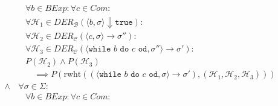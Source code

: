 \begin{align*}
																		                  & \quad \forall b \in \textit{BExp} : \forall c \in \textit{Com} : \tag{Ausdrucksbestandteile}                                                                                                                                                              \\
																		                  & \quad \forall \mathcal{H} _ 1 \in \textit{DER} _ \mathcal{B} (\langle b, \sigma \rangle \Downarrow \texttt{true}) : \tag{Kalkülfremde Herleitungen}                                                                                                       \\
																		                  & \quad \forall \mathcal{H} _ 2 \in \textit{DER} _ \mathcal{C} (\langle c, \sigma \rangle \rightarrow \sigma'') : \tag{Herleitungen in Prämisse}                                                                                                            \\
																		                  & \quad \forall \mathcal{H} _ 3 \in \textit{DER} _ \mathcal{C} (\langle \texttt{while } b \texttt{ do } c \texttt{ od}, \sigma'' \rangle \rightarrow \sigma') : \tag{Herleitungen in Prämisse}                                                              \\
																		                  & \quad P(\mathcal{H} _ 2) \land P(\mathcal{H} _ 3) \tag{Prämisse}                                                                                                                                                                                          \\
																		                  & \quad\quad \implies P(\text{rwht}((\langle \texttt{while } b \texttt{ do } c \texttt{ od}, \sigma \rangle \rightarrow \sigma'), (\mathcal{H} _ 1, \mathcal{H} _ 2, \mathcal{H} _ 3))) \tag{Konklusion}                                                    \\
																		\land             & \,\forall \sigma \in \Sigma : \tag{Zustände}                                                                                                                                                                                                              \\
																		                  & \quad \forall b \in \textit{BExp} : \forall c \in \textit{Com} : \tag{Ausdrucksbestandteile}                                                                                                                                                              \\

\end{align*}
